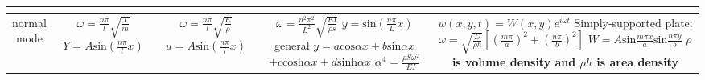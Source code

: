 \documentclass{article}
\begin{document}
\begin{table}[htbp]
\begin{tabular}{|c|c|c|c|c|}
{{        }}\\
      \hline
      \makecell[c]{normal\\ mode}& \makecell[c]{$\omega=\frac{n\pi}{l}\sqrt{\frac{T}{m}}$ \\$Y=A \text{sin}(\frac{n\pi}{l}x)$}
      &\makecell[c]{$\omega=\frac{n\pi}{l}\sqrt{\frac{E}{\rho}}$\\ $u=A \text{sin}(\frac{n\pi}{l}x)$}
      &\makecell[c]{
        $\omega=\frac{n^{2}\pi^{2}}{L^{2}}\sqrt{\frac{EI}{\rho s}}$
        $y=\text{sin}(\frac{n \pi}{L}x)$\\
        general $y=a\text{cos}\alpha x+b\text{sin}\alpha x$\\
        $+c \text{cosh}\alpha x+d \text{sinh}\alpha x$\\
        $\alpha^4 = \frac{\rho S \omega^2}{EI}$
      }
      &\makecell[c]{
        $w(x,y,t)=W(x,y)e^{i\omega t}$\\
        Simply-supported plate:\\
        $\omega=\sqrt{\frac{D}{\rho h}}[(\frac{m\pi}{a})^{2}+(\frac{n \pi}{b})^{2}]$\\
      $W=A\text{sin}\frac{m\pi x}{a}\text{sin}\frac{n \pi y}{b}$\\
      \textbf{$\rho$ is volume density and $\rho h$ is area density}
      }\\
      \hline
    \end{tabular}
  \end{table}
\end{document}
